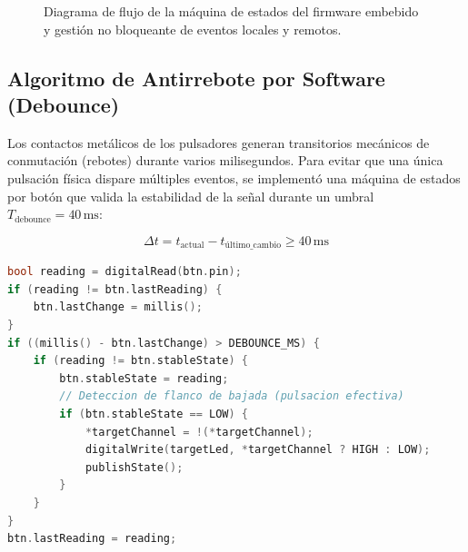 \documentclass[11pt,a4paper]{article}
\begin{document}
\begin{figure}[htbp]
{%
    }
    \caption{Diagrama de flujo de la máquina de estados del firmware embebido y gestión no bloqueante de eventos locales y remotos.}
    \label{fig:diagrama_flujo_firmware}
\end{figure}

\subsection{Algoritmo de Antirrebote por Software (Debounce)}
Los contactos metálicos de los pulsadores generan transitorios mecánicos de conmutación (rebotes) durante varios milisegundos. Para evitar que una única pulsación física dispare múltiples eventos, se implementó una máquina de estados por botón que valida la estabilidad de la señal durante un umbral $T_{\text{debounce}} = 40\,\text{ms}$:

\begin{equation}
    \Delta t = t_{\text{actual}} - t_{\text{último\_cambio}} \ge 40\,\text{ms}
\end{equation}

\begin{lstlisting}[language=C++, caption={Lógica de detección de flancos y antirrebote no bloqueante}]
bool reading = digitalRead(btn.pin);
if (reading != btn.lastReading) {
    btn.lastChange = millis();
}
if ((millis() - btn.lastChange) > DEBOUNCE_MS) {
    if (reading != btn.stableState) {
        btn.stableState = reading;
        // Deteccion de flanco de bajada (pulsacion efectiva)
        if (btn.stableState == LOW) {
            *targetChannel = !(*targetChannel);
            digitalWrite(targetLed, *targetChannel ? HIGH : LOW);
            publishState();
        }
    }
}
btn.lastReading = reading;
\end{lstlisting}
\end{document}

